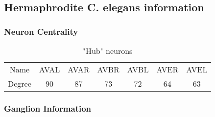 \subsection{Hermaphrodite C. elegans information}
\label{sec:Hermaphrodite C. elegans information}

\subsubsection{Neuron Centrality}
\begin{table}
\begin{center}
  \caption{"Hub" neurons \cite{morita_geometrical_2001} }

  \begin{tabular}{c c c c c c c}
    Name & AVAL & AVAR & AVBR & AVBL & AVER & AVEL \\
    Degree & 90 & 87 & 73 & 72 & 64 & 63 \\

  \end{tabular}
\end{center}

\subsubsection{Ganglion Information}

\end{table}
